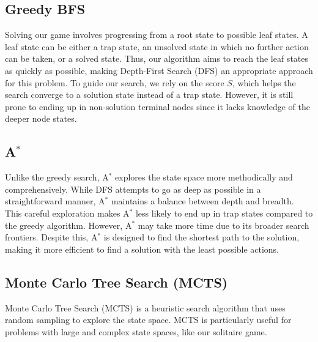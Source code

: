 \subsection{Greedy BFS}
Solving our game involves progressing from a root state to possible leaf states. A leaf state can be either a trap state, an unsolved state in which no further action can be taken, or a solved state. Thus, our algorithm aims to reach the leaf states as quickly as possible, making Depth-First Search (DFS) an appropriate approach for this problem. To guide our search, we rely on the score $S$, which helps the search converge to a solution state instead of a trap state. However, it is still prone to ending up in non-solution terminal nodes since it lacks knowledge of the deeper node states.

\subsection{A$^*$}
Unlike the greedy search, A$^*$ explores the state space more methodically and comprehensively. While DFS attempts to go as deep as possible in a straightforward manner, A$^*$ maintains a balance between depth and breadth. This careful exploration makes A$^*$ less likely to end up in trap states compared to the greedy algorithm. However, A$^*$ may take more time due to its broader search frontiers. Despite this, A$^*$ is designed to find the shortest path to the solution, making it more efficient to find a solution with the least possible actions.

\subsection{Monte Carlo Tree Search (MCTS)}
Monte Carlo Tree Search (MCTS) is a heuristic search algorithm that uses random sampling to explore the state space. MCTS is particularly useful for problems with large and complex state spaces, like our solitaire game.


